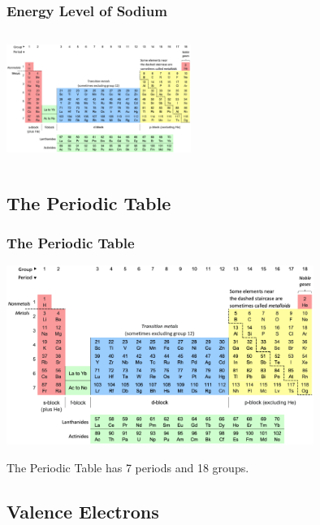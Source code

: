 \documentclass{beamer}
\begin{document}
\begin{frame}
    \frametitle{Energy Level of Sodium}
    \begin{columns}
        
        \begin{column}{0.5\textwidth}
            \includegraphics[width=6cm]{../../../../public/images/pTable.png}
            
        \end{column}
        \begin{column}{0.5\textwidth}
            
        \end{column}
    \end{columns}

\end{frame}


\subsection{The Periodic Table}


\begin{frame}
    \frametitle{The Periodic Table}
    \includegraphics[width=10cm]{../../../../public/images/pTable.png}

\onslide The Periodic Table has
\pause \alert{7}
\onslide periods and 
\pause \alert{18} 
\onslide groups.


\end{frame}

\subsection{Valence Electrons}
\end{document}
